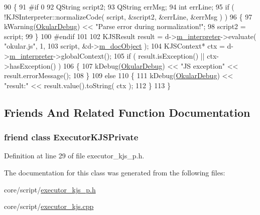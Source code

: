 \begin{DoxyCode}
90 \{
91 \textcolor{preprocessor}{#if 0}
92     QString script2;
93     QString errMsg;
94     \textcolor{keywordtype}{int} errLine;
95     \textcolor{keywordflow}{if} ( !KJSInterpreter::normalizeCode( script, &script2, &errLine, &errMsg ) )
96     \{
97         kWarning(\hyperlink{debug__p_8h_af16c6e32a95969dd0605d792ec9807c7}{OkularDebug}) << \textcolor{stringliteral}{"Parse error during normalization!"};
98         script2 = script;
99     \}
100 \textcolor{preprocessor}{#endif}
101 
102     KJSResult result = d->\hyperlink{classOkular_1_1ExecutorKJSPrivate_aab3d209d83b8336b64fd8af397dff44c}{m\_interpreter}->evaluate( \textcolor{stringliteral}{"okular.js"}, 1,
103                                                    script, &d->\hyperlink{classOkular_1_1ExecutorKJSPrivate_a37b97b1e212263d57d46eabf7ab21a67}{m\_docObject} );
104     KJSContext* ctx = d->\hyperlink{classOkular_1_1ExecutorKJSPrivate_aab3d209d83b8336b64fd8af397dff44c}{m\_interpreter}->globalContext();
105     \textcolor{keywordflow}{if} ( result.isException() || ctx->hasException() )
106     \{
107         kDebug(\hyperlink{debug__p_8h_af16c6e32a95969dd0605d792ec9807c7}{OkularDebug}) << \textcolor{stringliteral}{"JS exception"} << result.errorMessage();
108     \}
109     \textcolor{keywordflow}{else}
110     \{
111         kDebug(\hyperlink{debug__p_8h_af16c6e32a95969dd0605d792ec9807c7}{OkularDebug}) << \textcolor{stringliteral}{"result:"} << result.value().toString( ctx );
112     \}
113 \}
\end{DoxyCode}


\subsection{Friends And Related Function Documentation}
\hypertarget{classOkular_1_1ExecutorKJS_a0ff6ccb3d6d7ff1e363d4d6be9cf7128}{
\subsubsection[{Executor\+K\+J\+S\+Private}]{\setlength{\rightskip}{0pt plus 5cm}friend class {\bf Executor\+K\+J\+S\+Private}\hspace{0.3cm}{\ttfamily [friend]}}}\label{classOkular_1_1ExecutorKJS_a0ff6ccb3d6d7ff1e363d4d6be9cf7128}


Definition at line 29 of file executor\+\_\+kjs\+\_\+p.\+h.



The documentation for this class was generated from the following files\+:\begin{DoxyCompactItemize}
\item 
core/script/\hyperlink{executor__kjs__p_8h}{executor\+\_\+kjs\+\_\+p.\+h}\item 
core/script/\hyperlink{executor__kjs_8cpp}{executor\+\_\+kjs.\+cpp}\end{DoxyCompactItemize}
